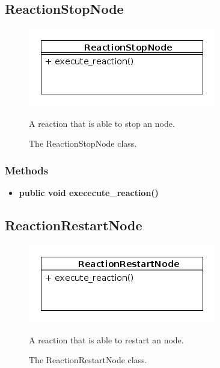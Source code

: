 \newpage
\subsection{ReactionStopNode}
\begin{figure}[htbp]
	\begin{minipage}[t]{8cm}
		\vspace{0pt}
		\centering
		\includegraphics[scale=0.6]{./diagram_pictures/reactor/ReactionStopNode.png}
		\caption{The ReactionStopNode class.}
	\end{minipage}
	\hfill
	\begin{minipage}[t]{8cm}
		\vspace{10pt}
			A reaction that is able to stop an node.
	\end{minipage}
\end{figure}  

\subsubsection{Methods}
\begin{itemize}
	\item \textbf{ public void exececute\_reaction() }\\
\end{itemize}

\newpage
\subsection{ReactionRestartNode}
\begin{figure}[htbp]
	\begin{minipage}[t]{8cm}
		\vspace{0pt}
		\centering
		\includegraphics[scale=0.6]{./diagram_pictures/reactor/ReactionRestartNode.png}
		\caption{The ReactionRestartNode class.}
	\end{minipage}
	\hfill
	\begin{minipage}[t]{8cm}
		\vspace{10pt}
			A reaction that is able to restart an node.
	\end{minipage}
\end{figure}  

